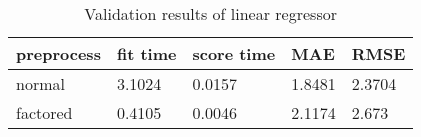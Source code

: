 \begin{table}[H]
    \centering
    \begin{tabular}{l|llll}
    \toprule
    \textbf{preprocess} & \textbf{fit time} & \textbf{score time} & \textbf{MAE} & \textbf{RMSE} \\ \midrule
    normal  &     3.1024 & 0.0157 & 1.8481 & 2.3704 \\
    \midrule
    factored &    0.4105 & 0.0046 & 2.1174 & 2.673  \\
    \bottomrule       
    \end{tabular}
    \caption{Validation results of linear regressor}
    \label{tab:val_linear}
    \end{table}

